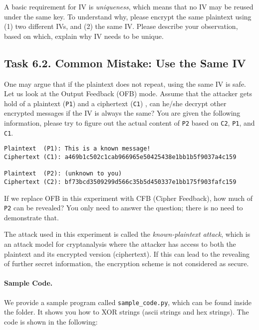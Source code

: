 A basic requirement for IV is \textit{uniqueness},
which means that no IV may be reused under the same key. To understand why,
please encrypt the same plaintext using (1) two different IVs, and (2)
the same IV. Please describe your observation, based on which, explain why
IV needs to be unique.



\subsection{Task 6.2. Common Mistake: Use the Same IV}

One may argue that if the plaintext does not repeat, using
the same IV is safe. Let us look at the Output Feedback (OFB) mode.
Assume that the attacker gets hold of a plaintext (\texttt{P1})
and a ciphertext (\texttt{C1}) ,
can he/she decrypt other encrypted messages if the IV is always the same?
You are given the following information, please try to figure out
the actual content of \texttt{P2} based on \texttt{C2}, \texttt{P1},
and \texttt{C1}.


\begin{lstlisting}
Plaintext  (P1): This is a known message!
Ciphertext (C1): a469b1c502c1cab966965e50425438e1bb1b5f9037a4c159

Plaintext  (P2): (unknown to you)
Ciphertext (C2): bf73bcd3509299d566c35b5d450337e1bb175f903fafc159
\end{lstlisting}

If we replace OFB in this experiment with
CFB (Cipher Feedback), how much of \texttt{P2} can be revealed? You
only need to answer the question; there is no need to demonstrate that.

The attack used in this experiment is called the \textit{known-plaintext
attack}, which is an attack model for cryptanalysis where the
attacker has access to both the plaintext and its
encrypted version (ciphertext). If this can lead to
the revealing of further secret information, the encryption scheme is
not considered as secure.


\paragraph{Sample Code.} We provide a sample program called \texttt{sample\_code.py},
which can be found inside the  folder. It shows you 
how to XOR strings (ascii strings and hex strings). The code
is shown in the following:

